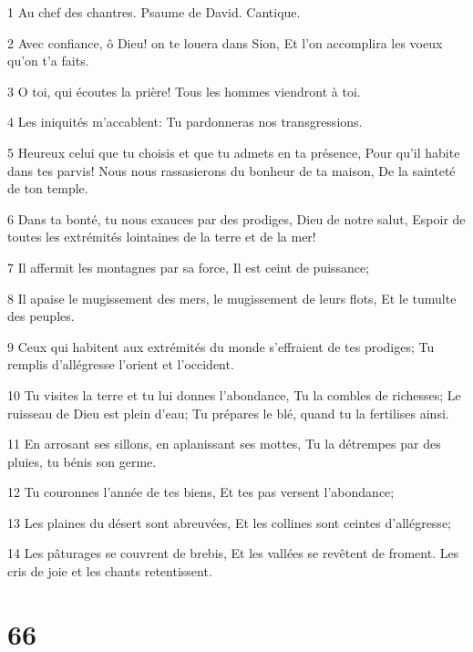 \par 1 Au chef des chantres. Psaume de David. Cantique.
\par 2 Avec confiance, ô Dieu! on te louera dans Sion, Et l'on accomplira les voeux qu'on t'a faits.
\par 3 O toi, qui écoutes la prière! Tous les hommes viendront à toi.
\par 4 Les iniquités m'accablent: Tu pardonneras nos transgressions.
\par 5 Heureux celui que tu choisis et que tu admets en ta présence, Pour qu'il habite dans tes parvis! Nous nous rassasierons du bonheur de ta maison, De la sainteté de ton temple.
\par 6 Dans ta bonté, tu nous exauces par des prodiges, Dieu de notre salut, Espoir de toutes les extrémités lointaines de la terre et de la mer!
\par 7 Il affermit les montagnes par sa force, Il est ceint de puissance;
\par 8 Il apaise le mugissement des mers, le mugissement de leurs flots, Et le tumulte des peuples.
\par 9 Ceux qui habitent aux extrémités du monde s'effraient de tes prodiges; Tu remplis d'allégresse l'orient et l'occident.
\par 10 Tu visites la terre et tu lui donnes l'abondance, Tu la combles de richesses; Le ruisseau de Dieu est plein d'eau; Tu prépares le blé, quand tu la fertilises ainsi.
\par 11 En arrosant ses sillons, en aplanissant ses mottes, Tu la détrempes par des pluies, tu bénis son germe.
\par 12 Tu couronnes l'année de tes biens, Et tes pas versent l'abondance;
\par 13 Les plaines du désert sont abreuvées, Et les collines sont ceintes d'allégresse;
\par 14 Les pâturages se couvrent de brebis, Et les vallées se revêtent de froment. Les cris de joie et les chants retentissent.

\chapter{66}


